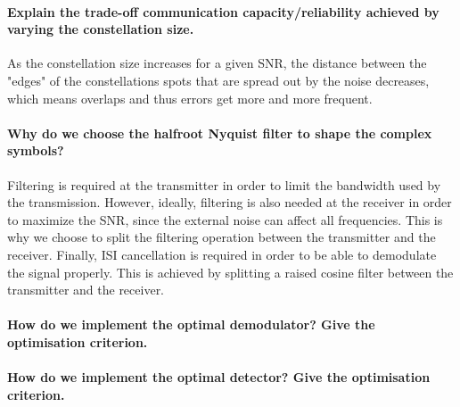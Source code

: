 \paragraph{Explain the trade-off communication capacity/reliability achieved by varying the constellation size.}
As the constellation size increases for a given SNR, the distance between the "edges" of the constellations spots that are spread out by the noise decreases, which means overlaps and thus errors get more and more frequent.
\paragraph{Why do we choose the halfroot Nyquist filter to shape the complex symbols?}
Filtering is required at the transmitter in order to limit the bandwidth used by the transmission. However, ideally, filtering is also needed at the receiver in order to maximize the SNR, since the external noise can affect all frequencies. This is why we choose to split the filtering operation between the transmitter and the receiver. Finally, ISI cancellation is required in order to be able to demodulate the signal properly. This is achieved by splitting a raised cosine filter between the transmitter and the receiver.
\paragraph{How do we implement the optimal demodulator? Give the optimisation criterion.}
\paragraph{How do we implement the optimal detector? Give the optimisation criterion.}
